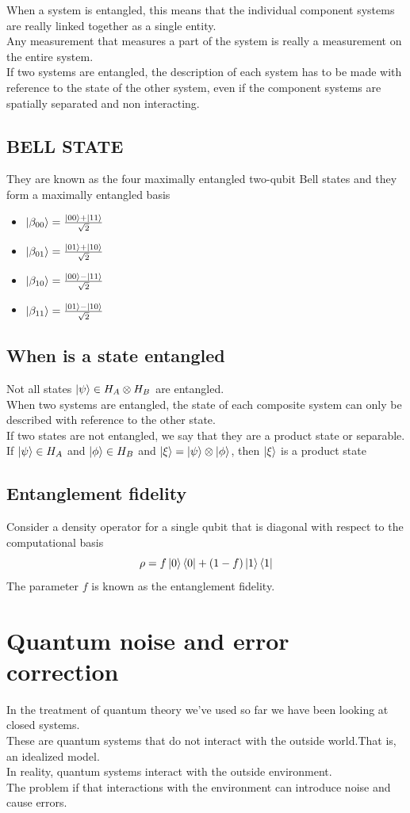 \documentclass[12pt,oneside]{book}
\begin{document}
When a system is entangled, this means that the individual component systems are really linked together as a single entity.\\
Any measurement that measures a part of the system is really a measurement on the entire system.\\

If two systems are entangled, the description of each system has to be made with reference to the state of the other system, even if the component systems are spatially separated and non interacting.
\section{BELL STATE}
They are known as the four maximally entangled two-qubit Bell states and they form a maximally entangled basis
\begin{itemize}
    \item $\ket{\beta_{00}} = \frac{\ket{00} + \ket{11}}{\sqrt{2}}$
    \item $\ket{\beta_{01}} = \frac{\ket{01} + \ket{10}}{\sqrt{2}}$
    \item $\ket{\beta_{10}} = \frac{\ket{00} - \ket{11}}{\sqrt{2}}$
    \item $\ket{\beta_{11}} = \frac{\ket{01} - \ket{10}}{\sqrt{2}}$
\end{itemize}
\section{When is a state entangled}
    Not all states $\ket{\psi} \in H_A \otimes H_B$ are entangled.\\
    When two systems are entangled, the state of each composite system can only be described with reference to the other state.\\
    If two states are not entangled, we say that they are a product state or separable.\\
    If $\ket{\psi} \in H_A$ and $\ket{\phi} \in H_B$ and $\ket{\xi} = \ket{\psi}\otimes\ket{\phi}$, then $\ket{\xi}$ is a product state
\section{Entanglement fidelity}
Consider a density operator for a single qubit that is diagonal with respect to the computational basis
\[ \rho = f\ket{0}\bra{0} + (1-f)\ket{1}\bra{1} \]
The parameter $f$ is known as the entanglement fidelity.

\chapter{Quantum noise and error correction}
In the treatment of quantum theory we’ve used so far we have been looking at closed systems.\\
These are quantum systems that do not interact with the outside world.That is, an idealized model.\\
In reality, quantum systems interact with the outside environment.\\
The problem if that interactions with the environment can introduce noise and cause errors.\\
\end{document}
